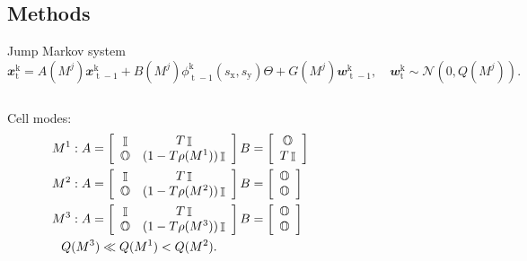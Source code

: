 \documentclass[mathserif,11pt]{beamer}
\DeclareMathOperator{\eye}{\mathbb{I}}
\DeclareMathOperator{\zeros}{\mathbb{O}}
\DeclareMathOperator{\td}{\mathrm{t}}
\DeclareMathOperator{\kd}{\mathrm{k}}
\begin{document}
\subsection{Methods}
\begin{frame}{Jump Markov system}
\vspace{-1cm}
\begin{equation*}\label{eq_dyn1}
\mathbfit{x}_{\td}^{\kd} = A(M^j)\mathbfit{x}_{\td-1}^{\kd} + B(M^j)\phi_{\td-1}^{\kd}(s_{\mathrm{x}},s_{\mathrm{y}}) \Theta + G(M^j)\mathbfit{w}_{\td-1}^{\kd}, \quad \mathbfit{w}_{\td}^{\kd} \sim \mathcal{N}(0,Q(M^j)).
\end{equation*}
\begin{columns}
	\begin{column}{0.55\textwidth}
	\footnotesize{
	Cell modes:
	\begin{align*}
	M^1&: A = \left[\begin{array}{cc}
	\eye & T\eye \\
	\zeros & (1-T\rho(M^1)) \eye
	\end{array}\right] 
	\hfil 
	B = \left[\begin{array}{c}
	\zeros \\ T \eye
	\end{array}\right]
	\\
	M^2&: A = \left[\begin{array}{cc}
	\eye & T\eye \\
	\zeros & (1-T\rho(M^2)) \eye
	\end{array}\right]
	\hfil 
	B = \left[\begin{array}{c}
	\zeros \\ \zeros
	\end{array}\right]
	\\
	M^3&: A = \left[\begin{array}{cc}
	\eye & T\eye \\
	\zeros & (1-T\rho(M^3)) \eye
	\end{array}\right]
	\hfil 
	B = \left[\begin{array}{c}
	\zeros \\ \zeros
	\end{array}\right]
	\\
	Q&(M^3) \ll Q(M^1) < Q(M^2).
	\end{align*}
}
\end{column}
\begin{column}{0.45\textwidth}
	\scalebox{0.58}{}
\end{column}
\end{columns}
\end{frame}
\end{document}

